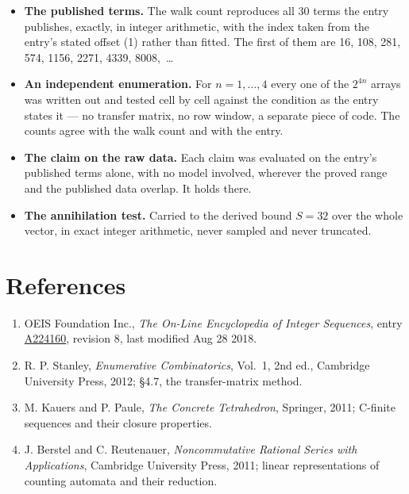 \documentclass[11pt]{article}
\theoremstyle{definition}
\begin{document}
\begin{itemize}

\item {\bfseries The published terms.} The walk count reproduces all 30 terms the entry publishes, exactly, in integer arithmetic, with the index taken from the entry's stated offset (1) rather than fitted. The first of them are 16, 108, 281, 574, 1156, 2271, 4339, 8008,~\dots

\item {\bfseries An independent enumeration.} For $n = 1,\dots,4$ every one of the $2^{4n}$ arrays was written out and tested cell by cell against the condition as the entry states it --- no transfer matrix, no row window, a separate piece of code. The counts agree with the walk count and with the entry.

\item {\bfseries The claim on the raw data.} Each claim was evaluated on the entry's published terms alone, with no model involved, wherever the proved range and the published data overlap. It holds there.

\item {\bfseries The annihilation test.} Carried to the derived bound $S = 32$ over the whole vector, in exact integer arithmetic, never sampled and never truncated.

\end{itemize}

\section{References}

\begin{enumerate}

\item OEIS Foundation Inc., \emph{The On-Line Encyclopedia of Integer Sequences}, entry \href{https://oeis.org/A224160}{A224160}, revision 8, last modified Aug 28 2018.

\item R. P. Stanley, \emph{Enumerative Combinatorics}, Vol.~1, 2nd ed., Cambridge University Press, 2012; \S4.7, the transfer-matrix method.

\item M. Kauers and P. Paule, \emph{The Concrete Tetrahedron}, Springer, 2011; C-finite sequences and their closure properties.

\item J. Berstel and C. Reutenauer, \emph{Noncommutative Rational Series with Applications}, Cambridge University Press, 2011; linear representations of counting automata and their reduction.

\end{enumerate}
\end{document}
